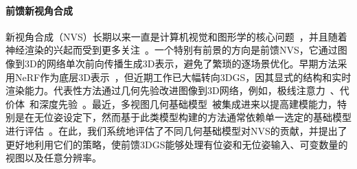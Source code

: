 \paragraph{前馈新视角合成}

新视角合成（NVS）长期以来一直是计算机视觉和图形学的核心问题~\cite{levoy1996light,heigl1999plenoptic,buehler2001unstructured}，并且随着神经渲染的兴起而受到更多关注~\cite{sitzmann2019scene,sitzmann2021light,mildenhall2020nerf,kerbl20233d,govindarajan2025radiant}。一个特别有前景的方向是前馈NVS，它通过图像到3D的网络单次前向传播生成3D表示，避免了繁琐的逐场景优化。早期方法采用NeRF作为底层3D表示~\cite{yu2021pixelnerf,chen2021mvsnerf,lin2022efficient,chen2025explicit,hong2024lrm,xu2024murf}，但近期工作已大幅转向3DGS，因其显式的结构和实时渲染能力。代表性方法通过几何先验改进图像到3D网络，例如，极线注意力~\cite{charatan2024pixelsplat}、代价体~\cite{chen2024mvsplat}和深度先验~\cite{xu2024murf}。最近，多视图几何基础模型~\cite{dust3r,Mv-dust3r+,fast3r,wang2025vggt}被集成进来以提高建模能力，特别是在无位姿设定下，然而基于此类模型构建的方法通常依赖单一选定的基础模型进行评估~\cite{smart2024splatt3r,ye2024no,jiang2025anysplat}。在此，我们系统地评估了不同几何基础模型对NVS的贡献，并提出了更好地利用它们的策略，使前馈3DGS能够处理有位姿和无位姿输入、可变数量的视图以及任意分辨率。
